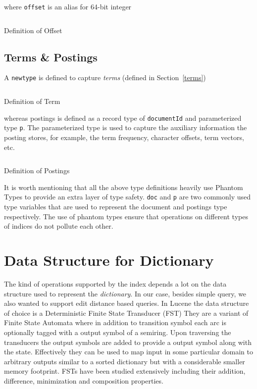\pagebreak
\noindent where \texttt{offset} is an alias for 64-bit integer
\begin{listing}
\inputminted{haskell}{hs/offset.hs}
\caption{Definition of Offset}
\end{listing}

\subsection{Terms \& Postings}
A \texttt{newtype} is defined to capture \textit{terms} (defined in Section~\ref{terms})
\begin{listing}
\inputminted{haskell}{hs/term.hs}
\caption{Definition of Term}
\end{listing}

\noindent whereas postings is defined as a record type of \texttt{documentId} and parameterized type \texttt{p}.
The parameterized type is used to capture the auxiliary information the posting stores, for example,
the term frequency, character offsets, term vectors, etc.
\begin{listing}
\inputminted{haskell}{hs/postings.hs}
\caption{Definition of Postings}
\end{listing}

It is worth mentioning that all the above type definitions heavily use Phantom Types\cite{cheney2003phantom} to provide an extra layer of type safety.
\texttt{doc} and \texttt{p} are two commonly used type variables that are used to represent the document and postings type respectively.
The use of phantom types ensure that operations on different types of indices do not pollute each other.


\section{Data Structure for Dictionary}
The kind of operations supported by the index depends a lot on the data structure used to represent the \textit{dictionary}.
In our case, besides simple query, we also wanted to support edit distance based queries.
In Lucene\cite{mccandless2012fst} the data structure of choice is a Deterministic Finite State Transducer\cite{mohri2004weighted} (FST)
They are a variant of Finite State Automata where in addition to transition symbol each arc is optionally tagged with a output symbol of a semiring.
Upon traversing the transducers the output symbols are added to provide a output symbol along with the state.
Effectively they can be used to map input in some particular domain to arbitrary outputs similar to a sorted dictionary but with a considerable smaller memory footprint.
FSTs have been studied extensively including their addition, difference, minimization and composition properties.

